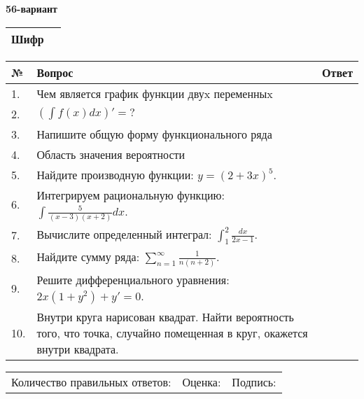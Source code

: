 \documentclass{article}
\begin{document}
  \egroup
  
  \newpage
  
  
  \textbf{56-вариант}\\
  
  \bgroup
  \def\arraystretch{1.6} %
  
  \begin{tabular}{|m{5.7cm}|m{9.5cm}|}
  \hline
  Шифр & \\
  \hline
  \end{tabular}
  
  \vspace{1cm}
  
  \begin{tabular}{|m{0.7cm}|m{10cm}|m{4cm}|}
  \hline
  № & Вопрос & Ответ \\
  \hline
  1. & Чем является график функции двуx переменныx &  \\
  \hline
  2. & \(\left( \int{f(x)dx} \right)' = ?\) &  \\
  \hline
  3. & Напишите общую форму функционального ряда &  \\
  \hline
  4. & Область значения вероятности &  \\
  \hline
  5. & Найдите производную функции: \(y = (2 + 3x)^{5}\). &  \\
  \hline
  6. & Интегрируем рациональную функцию: \(\int{\frac{5}{(x - 3)(x + 2)}dx}\). &  \\
  \hline
  7. & Вычислите определенный интеграл: \(\int_{1}^{2}\frac{dx}{2x -1}\). &  \\
  \hline
  8. & Найдите сумму ряда: \(\sum_{n = 1}^{\infty}\frac{1}{n(n + 2)}\). &  \\
  \hline
  9. & Решите дифференциального уравнения: \(2x\left( 1 + y^{2} \right) + y' = 0\). &  \\
  \hline
  10. & Внутри круга нарисован квадрат. Найти вероятность того, что точка, случайно помещенная в круг, окажется внутри квадрата. &  \\
  \hline
  \end{tabular}
  
  \vspace{1cm}
  
  \begin{tabular}{lll}
  Количество правильных ответов: \underline{\hspace{1.5cm}} & 
  Оценка: \underline{\hspace{1.5cm}} & 
  Подпись: \underline{\hspace{2cm}} \\
  \end{tabular}
  
\end{document}
